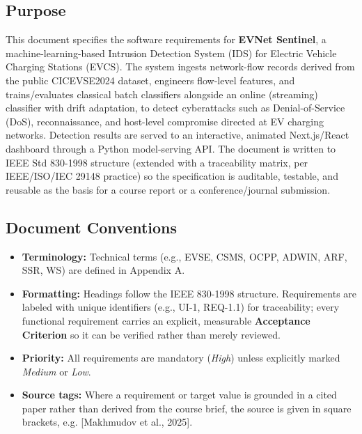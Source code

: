 \documentclass[11pt, a4paper]{article}
\begin{document}
\subsection{Purpose}
This document specifies the software requirements for \textbf{EVNet Sentinel}, a machine-learning-based Intrusion Detection System (IDS) for Electric Vehicle Charging Stations (EVCS). The system ingests network-flow records derived from the public CICEVSE2024 dataset, engineers flow-level features, and trains/evaluates classical batch classifiers alongside an online (streaming) classifier with drift adaptation, to detect cyberattacks such as Denial-of-Service (DoS), reconnaissance, and host-level compromise directed at EV charging networks. Detection results are served to an interactive, animated Next.js/React dashboard through a Python model-serving API. The document is written to IEEE Std 830-1998 structure (extended with a traceability matrix, per IEEE/ISO/IEC 29148 practice) so the specification is auditable, testable, and reusable as the basis for a course report or a conference/journal submission.

\subsection{Document Conventions}
\begin{itemize}
    \item \textbf{Terminology:} Technical terms (e.g., EVSE, CSMS, OCPP, ADWIN, ARF, SSR, WS) are defined in Appendix A.
    \item \textbf{Formatting:} Headings follow the IEEE 830-1998 structure. Requirements are labeled with unique identifiers (e.g., UI-1, REQ-1.1) for traceability; every functional requirement carries an explicit, measurable \textbf{Acceptance Criterion} so it can be verified rather than merely reviewed.
    \item \textbf{Priority:} All requirements are mandatory (\textit{High}) unless explicitly marked \textit{Medium} or \textit{Low}.
    \item \textbf{Source tags:} Where a requirement or target value is grounded in a cited paper rather than derived from the course brief, the source is given in square brackets, e.g. [Makhmudov et al., 2025].
\end{itemize}
\end{document}
